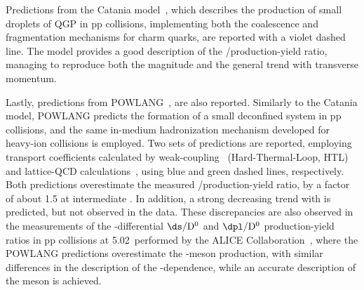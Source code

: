 Predictions from the Catania model~\cite{Minissale:2020bif}, which describes the production of small droplets of QGP in pp collisions, implementing both the coalescence and fragmentation mechanisms for charm quarks, are reported with a violet dashed line. The model provides a good description of the \ds/\dpl production-yield ratio, managing to reproduce both the magnitude and the general trend with transverse momentum. 

Lastly, predictions from POWLANG~\cite{Beraudo:2023nlq}, are also reported. Similarly to the Catania model, POWLANG predicts the formation of a small deconfined system in pp collisions, and the same in-medium hadronization mechanism developed for heavy-ion collisions is employed. Two sets of predictions are reported, employing transport coefficients calculated by weak-coupling~\cite{Braaten:1989mz} (Hard-Thermal-Loop, HTL) and lattice-QCD calculations~\cite{Altenkort:2023oms}, using blue and green dashed lines, respectively. Both predictions overestimate the measured \ds/\dpl production-yield ratio, by a factor of about 1.5 at intermediate \pt. In addition, a strong decreasing trend with \pt is predicted, but not observed in the data. These discrepancies are also observed in the measurements of the \pt-differential $\ds/\mathrm{D^0}$ and $\dpl/\mathrm{D^0}$ production-yield ratios in pp collisions at 5.02~\tev performed by the ALICE Collaboration~\cite{Beraudo:2023nlq}, where the POWLANG predictions overestimate the \ds-meson production, with similar differences in the description of the \pt-dependence, while an accurate description of the \dpl meson is achieved.








